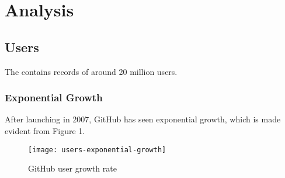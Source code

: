\newpage

\section{Analysis}

\subsection{Users}

The  contains records of around 20 million users.

\subsubsection{Exponential Growth}

After launching in 2007, GitHub has seen exponential growth, which is made evident from Figure 1.

\begin{figure}[htb]
\centering
\texttt{[image: users-exponential-growth]}
\caption{GitHub user growth rate}
\end{figure}

